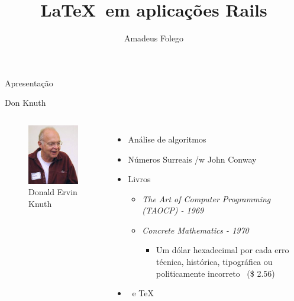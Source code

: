 \documentclass{beamer}
\author{Amadeus Folego}
\title{\LaTeX\ em aplicações Rails}
\date{}
\institute{
  \begin{tabular}{c c}        
    {\em www} & \url{http://badosu.com}\\
    {\em email} & \url{amadeusfolego@gmail.com}
  \end{tabular}
}
\begin{document}
  \begin{frame}[plain] 
    \titlepage
  \end{frame}
  \begin{frame}{Apresentação}
  \end{frame}
  \begin{frame}{Don Knuth}
    \begin{columns}[c]
        \begin{figure}[t]
          \includegraphics[width=\columnwidth]{192px-KnuthAtOpenContentAlliance}
          \caption*{\scriptsize Donald Ervin Knuth}
        \end{figure}
        \begin{itemize}
          \item Análise de algoritmos\pause
          \item \pause Números Surreais /w John Conway\pause
          \item Livros \pause
            \begin{itemize}
              \item {\em The Art of Computer Programming (TAOCP) - 1969} \pause
              \item {\em Concrete Mathematics - 1970} \pause 
              \begin{itemize}
                \item {\scriptsize Um dólar hexadecimal por cada erro técnica, histórica, tipográfica ou politicamente incorreto \ (\$ 2.56)} \pause 
              \end{itemize}
            \end{itemize}
          \item \MF\ e \TeX\ 
        \end{itemize}
    \end{columns}
  \end{frame}
\end{document}
